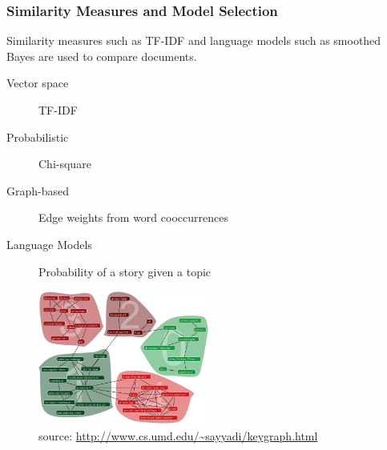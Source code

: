 \documentclass{beamer}
\begin{document}
\begin{frame}
	\frametitle{Similarity Measures and Model Selection}
        \small
	Similarity measures such as TF-IDF and language models such as smoothed Bayes are used to compare documents. 
        \footnotesize{
	\begin{description}
		\item[Vector space] TF-IDF \citep{carbonell1999cmu}
		\item[Probabilistic] Chi-square\citep{Swan:1999:EST:319950.319956}
		\item[Graph-based] Edge weights from word cooccurrences \tiny\citep{saha2012learning}
                  \footnotesize
                \item[Language Models] Probability of a story given a topic \citep{allan2000detections}
	\end{description}
        }\vspace{-1em}
\begin{figure}[h]
\centering
\includegraphics[width=0.5\textwidth]{images/keygraph}
\scriptsize{\caption{source: \url{http://www.cs.umd.edu/~sayyadi/keygraph.html}}}
\end{figure}
\end{frame}
\end{document}
